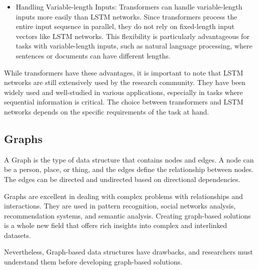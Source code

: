 \begin{itemize}
	\item Handling Variable-length Inputs: Transformers can handle variable-length inputs more easily than \ac{LSTM} networks. Since transformers process the entire input sequence in parallel, they do not rely on fixed-length input vectors like \ac{LSTM} networks. This flexibility is particularly advantageous for tasks with variable-length inputs, such as natural language processing, where sentences or documents can have different lengths.
	
\end{itemize}

While transformers have these advantages, it is important to note that LSTM networks are still extensively used by the research community. They have been widely used and well-studied in various applications, especially in tasks where sequential information is critical. The choice between transformers and \ac{LSTM} networks depends on the specific requirements of the task at hand.

\subsection{Graphs}
\label{subsec:3_graphs}


A Graph is the type of data structure that contains nodes and edges. A node can be a person, place, or thing, and the edges define the relationship between nodes. The edges can be directed and undirected based on directional dependencies. 

Graphs are excellent in dealing with complex problems with relationships and interactions. They are used in pattern recognition, social networks analysis, recommendation systems, and semantic analysis. Creating graph-based solutions is a whole new field that offers rich insights into complex and interlinked datasets. 

Nevertheless, Graph-based data structures have drawbacks, and researchers must understand them before developing graph-based solutions.

